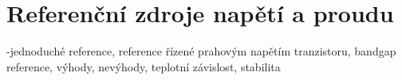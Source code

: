 \section{Referenční zdroje napětí a proudu}
-jednoduché reference, reference řízené prahovým napětím tranzistoru, bandgap reference, výhody, nevýhody, teplotní závislost, stabilita